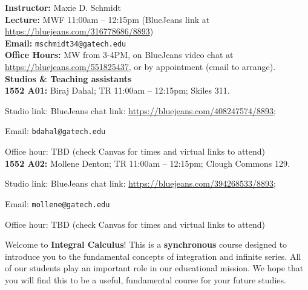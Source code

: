 \documentclass[11pt]{article}
\begin{document}
  
  \large {\bf Instructor:} Maxie D. Schmidt \\
     \large {\bf Lecture:} MWF 11:00am -- 12:15pm (BlueJeans link at \url{https://bluejeans.com/316778686/8893}) \\
     \large {\bf Email:} {\tt mschmidt34@gatech.edu} \\
     \large {\bf Office Hours:} MW from 3-4PM, on BlueJeans video chat at 
     \url{https://bluejeans.com/551825437}, or by appointment (email to arrange). \\

\large {\bf Studios \& Teaching assistants}\\
\large {\bf 1552 A01:} Biraj Dahal; TR 11:00am -- 12:15pm; Skiles 311.

\hspace{2.15 cm}
Studio link: BlueJeans chat link: \url{https://bluejeans.com/408247574/8893}; 

\hspace{2.15 cm} Email: {\tt bdahal@gatech.edu}

\hspace{2.15 cm}
Office hour: TBD (check Canvas for times and virtual links to attend) \\

\large {\bf 1552 A02:} Mollene Denton; TR 11:00am -- 12:15pm; Clough Commons 129.

\hspace{2.15 cm}
Studio link: BlueJeans chat link: \url{https://bluejeans.com/394268533/8893}; 

\hspace{2.15 cm} Email: {\tt mollene@gatech.edu}

\hspace{2.15 cm}
Office hour: TBD (check Canvas for times and virtual links to attend) \\




\vspace{5mm}

 Welcome to {\bf{\color{ffwwqq} Integral Calculus}}! This is a {\bf{\color{ffwwqq}synchronous}} course designed to introduce you to the fundamental concepts of integration and infinite series. All of our students play an important role in our educational mission. We hope that you will find this to be a useful, fundamental course for your future studies. 
 \\
\end{document}
